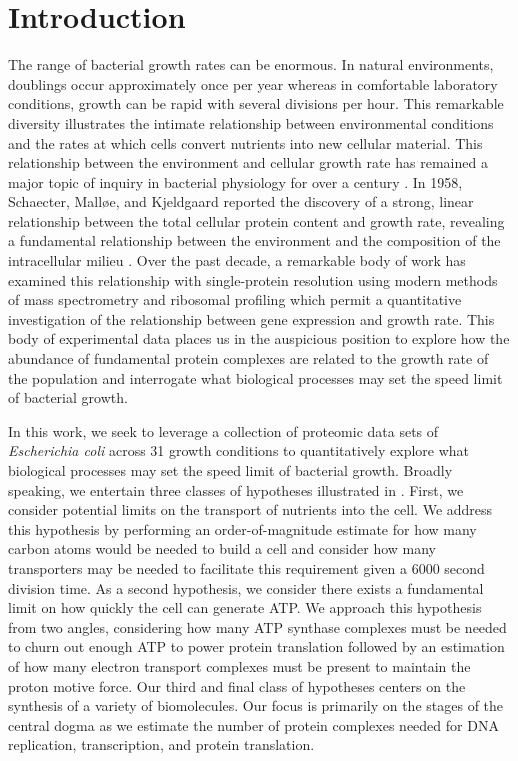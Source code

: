 

\section{Introduction}
The range of bacterial growth rates can be enormous. In natural environments,
doublings occur approximately once per year whereas in comfortable laboratory
conditions, growth can be rapid with several divisions per hour.
This remarkable diversity illustrates the intimate relationship between
environmental conditions and the rates at which cells convert nutrients into
new cellular material. This relationship between the environment and cellular
growth rate has remained a major topic of inquiry in bacterial physiology for
over a century \citep{jun2018}. In 1958, Schaecter, Mall\o e, and Kjeldgaard
reported the discovery of a strong, linear relationship between the total
cellular protein content and growth rate,  revealing a fundamental relationship
between the environment and the composition of the intracellular milieu \citep{schaechter1958}.
Over the past decade, a remarkable body
of work has examined this relationship with single-protein resolution using
modern methods of mass spectrometry \citep{valgepea2013,
peebo2015, schmidt2016} and ribosomal profiling \citep{li2014} which permit a
quantitative investigation of the relationship between gene expression and
growth rate. This body of experimental data places us in the auspicious position to
explore how the abundance of fundamental protein complexes are related to the
growth rate of the population and interrogate what biological processes may set
the speed limit of bacterial growth.

In this work, we seek to leverage a collection of proteomic data sets of
\textit{Escherichia coli} across 31 growth conditions to
quantitatively explore what biological processes may set the speed limit of
bacterial growth. Broadly speaking, we entertain three classes of hypotheses
illustrated in . First, we consider potential limits on the
transport of nutrients into the cell. We address this hypothesis by performing
an order-of-magnitude estimate for how many carbon atoms would be needed to
build a cell and consider how many transporters may be needed to facilitate this
requirement given a 6000 second division time.  As a second hypothesis, we consider there exists a fundamental limit on how
quickly the cell can generate ATP. We approach this hypothesis from two angles,
considering how many ATP synthase complexes must be needed to churn out enough
ATP to power protein translation followed by an estimation of how many electron
transport complexes must be present to maintain the proton motive force. Our third and final class of hypotheses centers on the synthesis of a variety of
biomolecules. Our focus is primarily on the stages of the central dogma as we
estimate the number of protein complexes needed for DNA replication,
transcription, and protein translation.

